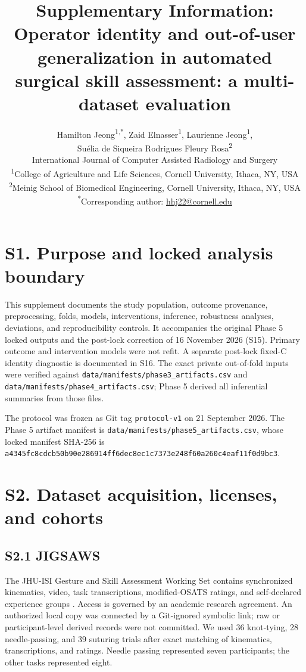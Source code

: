 \documentclass[11pt]{article}
\title{Supplementary Information: Operator identity and out-of-user generalization in automated surgical skill assessment: a multi-dataset evaluation}
\author{Hamilton Jeong\textsuperscript{1,*}, Zaid Elnasser\textsuperscript{1},
Laurienne Jeong\textsuperscript{1},\\
Su\'elia de Siqueira Rodrigues Fleury Rosa\textsuperscript{2}\\[0.5em]
\small International Journal of Computer Assisted Radiology and Surgery\\
\small \textsuperscript{1}College of Agriculture and Life Sciences, Cornell University, Ithaca, NY, USA\\
\small \textsuperscript{2}Meinig School of Biomedical Engineering, Cornell University, Ithaca, NY, USA\\
\small \textsuperscript{*}Corresponding author: \href{mailto:hhj22@cornell.edu}{hhj22@cornell.edu}}
\date{}
\begin{document}
\maketitle

\setcounter{secnumdepth}{0}
\section{S1. Purpose and locked analysis
boundary}\label{s1.-purpose-and-locked-analysis-boundary}

This supplement documents the study population, outcome provenance,
preprocessing, folds, models, interventions, inference, robustness
analyses, deviations, and reproducibility controls. It accompanies the
original Phase 5 locked outputs and the post-lock correction of 16
November 2026 (S15). Primary outcome and intervention models were not
refit. A separate post-lock fixed-C identity diagnostic is documented in
S16. The exact private out-of-fold inputs were verified against
\texttt{data/manifests/phase3\_artifacts.csv} and
\texttt{data/manifests/phase4\_artifacts.csv}; Phase 5 derived all
inferential summaries from those files.

The protocol was frozen as Git tag \texttt{protocol-v1} on 21 September
2026. The Phase 5 artifact manifest is
\texttt{data/manifests/phase5\_artifacts.csv}, whose locked manifest
SHA-256 is
\nolinkurl{a4345fc8cdcb50b90e286914ff6dec8ec1c7373e248f60a260c4eaf11f0d9bc3}.

\section{S2. Dataset acquisition, licenses, and
cohorts}\label{s2.-dataset-acquisition-licenses-and-cohorts}

\subsection{S2.1 JIGSAWS}\label{s2.1-jigsaws}

The JHU-ISI Gesture and Skill Assessment Working Set contains
synchronized kinematics, video, task transcriptions, modified-OSATS
ratings, and self-declared experience groups \citep{Ahmidi2017}. Access
is governed by an academic research agreement. An authorized local copy
was connected by a Git-ignored symbolic link; raw or participant-level
derived records were not committed. We used 36 knot-tying, 28
needle-passing, and 39 suturing trials after exact matching of
kinematics, transcriptions, and ratings. Needle passing represented
seven participants; the other tasks represented eight.
\end{document}
